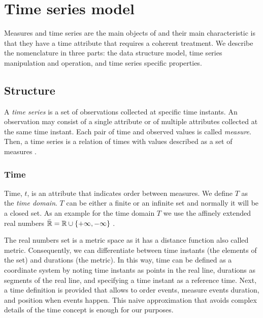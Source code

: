 


\section{Time series model}
\label{sec:model:TSMS}



Measures and time series are the main objects of  and their
main characteristic is that they have a time attribute that requires a
coherent treatment. We describe the  nomenclature in three
parts: the data structure model, time series manipulation and
operation, and time series specific properties.



\subsection{Structure}


A \emph{time series} is a set of observations collected at specific
time instants. An observation may consist of a single attribute or of
multiple attributes collected at the same time instant.  Each pair of
time and observed values is called \emph{measure}. Then, a time series
is a relation of times with values described as a set of measures .





\subsubsection{Time}

Time, $t$, is an attribute that indicates order between measures. We define
$T$ as the \emph{time domain}. $T$ can be either a finite or an infinite set
and normally it will be a closed set. As an example for the time
domain $T$ we use the affinely extended real numbers $\bar{\mathbb{R}} = \mathbb{R} \cup
\{+\infty,-\infty\}$ \cite{cantrell:extendedreal}.

The real numbers set is a metric space as it has a distance function
also called metric. Consequently, we can differentiate between time
instants (the elements of the set) and durations (the metric). In this
way, time can be defined as a coordinate system
\cite{iep:time-supplement,kopetz11:realtime} by noting time instants
as points in the real line, durations as segments of the real line,
and specifying a time instant as a reference time. Next, a time
definition is provided that allows to order events, measure events
duration, and position when events happen. This naive approximation
that avoids complex details of the time concept is enough for our
purposes.

